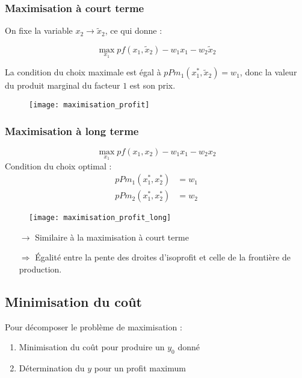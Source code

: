 \subsubsection{Maximisation à court terme}
On fixe la variable $x_2 \rightarrow \tilde{x}_2$, ce qui donne :

\begin{equation*}
\max_{x_1} p f(x_1,\tilde{x}_2) - w_1x_1 - w_2\tilde{x}_2
\end{equation*}

La condition du choix maximale est égal à $pPm_1(x_1^*, \tilde{x}_2) = w_1$, donc la valeur du produit marginal du facteur $1$ est son prix.
\begin{figure}[H]
	\centering
	\texttt{[image: maximisation\_profit]}
\end{figure}

\subsubsection{Maximisation à long terme}

\begin{equation*}
\max_{x_1} p f(x_1,x_2) - w_1x_1 - w_2x_2
\end{equation*}
Condition du choix optimal :
\begin{align*}
pPm_1(x_1^*, x_2^*) &= w_1\\
pPm_2(x_1^*, x_2^*) &= w_2
\end{align*}
\begin{figure}[H]
	\centering
	\texttt{[image: maximisation\_profit\_long]}
\end{figure}
\begin{itemize}
\item[$\rightarrow$] Similaire à la maximisation à court terme
\item[$\Rightarrow$] Égalité entre la pente des droites d'isoprofit et celle de la frontière de production.
\end{itemize}

\subsection{Minimisation du coût}

Pour décomposer le problème de maximisation :
\begin{enumerate}
\item Minimisation du coût pour produire un $y_0$ donné
\item Détermination du $y$ pour un profit maximum
\end{enumerate}


